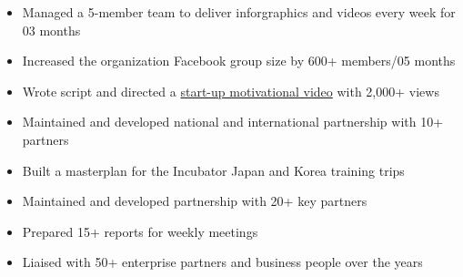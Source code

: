 \documentclass[10pt,a4paper,ragged2e]{altacv}
\begin{document}
\divider

\begin{itemize}
	\item Managed a 5-member team to deliver inforgraphics and videos every week for 03 months 
	\item Increased the organization Facebook group size by 600+ members/05 months
	\item Wrote script and directed a {\href{https://www.facebook.com/uavsnsw/videos/433640800560301/}{start-up motivational video}} with 2,000+ views
\end{itemize}

\divider

\begin{itemize}
	\item Maintained and developed national and international partnership with 10+ partners
	\item Built a masterplan for the Incubator Japan and Korea training trips 
\end{itemize}

\divider

\begin{itemize}
	\item Maintained and developed partnership with 20+ key partners
	\item Prepared 15+ reports for weekly meetings
	\item Liaised with 50+ enterprise partners and business people over the years
\end{itemize}
\end{document}
